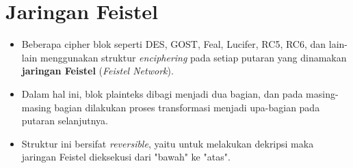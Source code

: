 \documentclass{article}
\begin{document}

\section*{Jaringan Feistel}

\begin{itemize}
    \item Beberapa cipher blok seperti DES, GOST, Feal, Lucifer, RC5, RC6, dan lain-lain menggunakan struktur \textit{enciphering} pada setiap putaran yang dinamakan \textbf{jaringan Feistel} (\textit{Feistel Network}).
    \item Dalam hal ini, blok plainteks dibagi menjadi dua bagian, dan pada masing-masing bagian dilakukan proses transformasi menjadi upa-bagian pada putaran selanjutnya.
    \item Struktur ini bersifat \textit{reversible}, yaitu untuk melakukan dekripsi maka jaringan Feistel dieksekusi dari "bawah" ke "atas".
\end{itemize}
\end{document}
